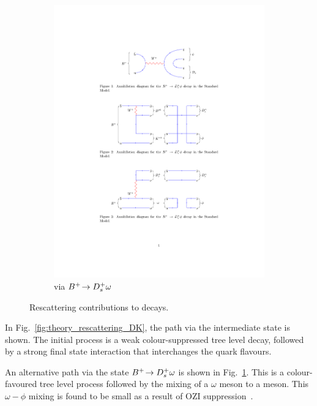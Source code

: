 \begin{figure}[!h]
\begin{subfigure}[m]{0.6\textwidth}
        \includegraphics[width=1.0\textwidth]{figs/Theory/B2DsPhi_Rescattering_B2Dsomega.pdf}
        \caption{via ${{{B}^+}}\!\rightarrow {\ensuremath{{D}^+_{s}}}\omega$}
        \label{fig:theory_rescattering_DsO}
    \end{subfigure}
    \caption{Rescattering contributions to \decay{\Bp}{\Dsp\phiz} decays.}
    \label{fig:Theory_rescattering}   
\end{figure}
In Fig.~\ref{fig:theory_rescattering_DK}, the path via the \decay{\Bp}{\Dstarz\Kstarp} intermediate state is shown. The initial process is a weak colour-suppressed tree level decay, followed by a strong final state interaction that interchanges the quark flavours. 

An alternative path via the state ${{{B}^+}}\!\rightarrow {\ensuremath{{D}^+_{s}}}\omega$ is shown in Fig.~\ref{fig:theory_rescattering_DsO}. This is a colour-favoured tree level process followed by the mixing of a $\omega$ meson to a \phiz meson. This $\omega-\phi$ mixing is found to be small as a result of OZI suppression~\cite{OKUBO1963165,PhysRevD.79.074006}.



